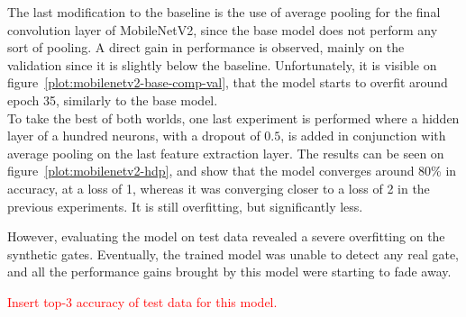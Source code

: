 The last modification to the baseline is the use of average pooling for the
final convolution layer of MobileNetV2, since the base model does not perform
any sort of pooling. A direct gain in performance is observed, mainly on the
validation since it is slightly below the baseline. Unfortunately, it is
visible on figure~\ref{plot:mobilenetv2-base-comp-val}, that the model starts
to overfit around epoch 35, similarly to the base model.\\

To take the best of both worlds, one last experiment is performed where a
hidden layer of a hundred neurons, with a dropout of $0.5$, is added in
conjunction with average pooling on the last feature extraction layer. The
results can be seen on figure~\ref{plot:mobilenetv2-hdp}, and show that the
model converges around 80\% in accuracy, at a loss of 1, whereas it was
converging closer to a loss of 2 in the previous experiments. It is still
overfitting, but significantly less.



However, evaluating the model on test data revealed a severe overfitting on the
synthetic gates. Eventually, the trained model was unable to detect any real
gate, and all the performance gains brought by this model were starting to fade
away.

\textcolor{red}{Insert top-3 accuracy of test data for this model.}
